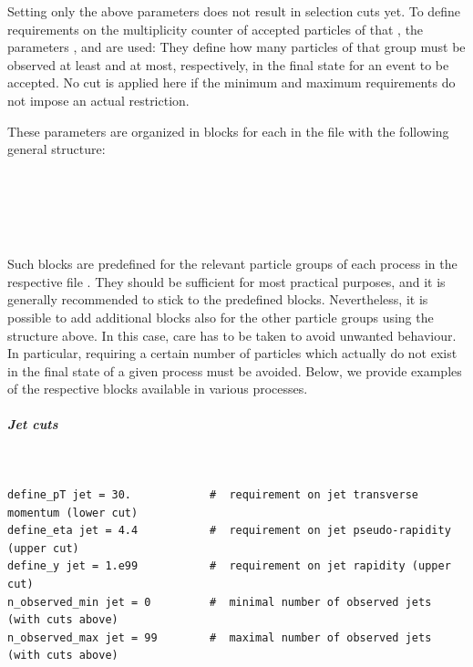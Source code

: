 \documentclass[english,11pt]{article}
\begin{document}
Setting only the above parameters does not result in selection cuts yet.
To define requirements on the multiplicity counter of accepted 
particles of that , %
the parameters , %
and  %
are used:
They define how many particles of that group must be observed at least and at most, respectively, in the final state for an event to be accepted. 
No cut is applied here if the minimum and maximum requirements do not impose an actual restriction.%

These parameters are organized in blocks for each  in the file  with the following general structure:

\\%
\\%
\\%
\\%
\vspace{0.1cm}

Such blocks are predefined for the relevant particle groups of each process 
in the respective file . They should be sufficient 
for most practical purposes, and it is generally recommended to stick to the 
predefined blocks. Nevertheless, it is possible to add additional blocks 
also for the other particle groups using the structure above. In this case, care 
has to be taken to avoid unwanted behaviour. 
In particular, requiring a certain number of particles which actually do not exist in the final state of a given process must be avoided.
Below, we provide examples of the respective 
blocks available in various processes.


\subparagraph{Jet cuts}\quad
\lstset{basicstyle=\scriptsize, frame=single}
{\tt
\begin{lstlisting}
define_pT jet =	30.            #  requirement on jet transverse momentum (lower cut)
define_eta jet = 4.4           #  requirement on jet pseudo-rapidity (upper cut)
define_y jet = 1.e99           #  requirement on jet rapidity (upper cut)
n_observed_min jet = 0         #  minimal number of observed jets (with cuts above)
n_observed_max jet = 99	       #  maximal number of observed jets (with cuts above)
\end{lstlisting}
}
\end{document}
